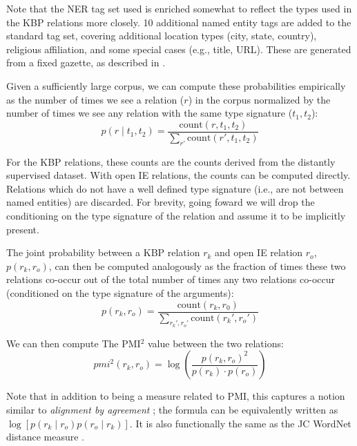Note that the NER tag set used is enriched somewhat to reflect the types used
  in the KBP relations more closely. 
10 additional named entity tags are added to the standard tag set, covering
  additional location types (city, state, country), religious affiliation,
  and some special cases (e.g., title, URL).
These are generated from a fixed gazette, as described in
  .

Given a sufficiently large corpus, we can compute these probabilities
  empirically as the number of times we see a relation ($r$)
  in the corpus normalized by the number of times we see any relation with the 
  same type signature ($t_1, t_2$):
\begin{equation*}
  p(r \mid t_1, t_2) = \frac{
    \textrm{count}(r, t_1, t_2)
  }{
    \sum_{r'}\textrm{count}(r', t_1, t_2)
  }
\end{equation*}

For the KBP relations, these counts are the counts derived from the distantly
  supervised dataset.
With open IE relations, the counts can be computed directly.
Relations which do not have a well defined type signature (i.e., are not
  between named entities) are discarded.
For brevity, going foward we will drop the conditioning on the type signature
  of the relation and assume it to be implicitly present.

The joint probability between a KBP relation $r_k$ and open IE relation
  $r_o$, $p(r_k, r_o)$, can then be computed analogously as the fraction of
  times these two relations co-occur out of the total number of times any two
  relations co-occur (conditioned on the type signature of the arguments):
\begin{equation*}
  p(r_k, r_o) = \frac{
    \textrm{count}(r_k, r_0)
  }{
    \sum_{r_k', r_o'}\textrm{count}(r_k', r_o')
  }
\end{equation*}

We can then compute The PMI$^2$ value between the two relations:
\begin{equation*}
  pmi^2(r_k, r_o) = \log \left( \frac{p(r_k, r_o)^2}{p(r_k) \cdot p(r_o)} \right)
\end{equation*}

Note that in addition to being a measure related to PMI, this captures
  a notion similar to \textit{alignment by agreement} 
  \cite{key:2006liang-alignment};
  the formula can be equivalently written as 
  $\log \left[ p(r_k \mid r_o) p(r_o \mid r_k)\right]$.
It is also functionally the same as the JC WordNet distance measure
  \cite{key:1997jc-similarity}.

